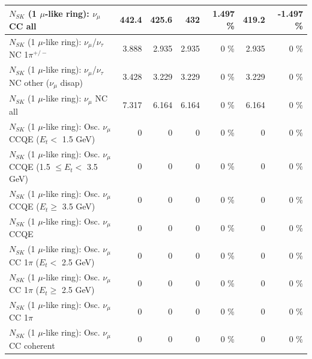 \begin{table}
\begin{tabular}{| l | r | r | r  r | r  r |}
                                $N_{SK}$ (1 $\mu$-like ring): $\nu_{\mu}$ CC all &           442.4 &           425.6 &             432 &    1.497 \%  &           419.2 &   -1.497 \%  \\ 
\hline
              $N_{SK}$ (1 $\mu$-like ring): $\nu_\mu$/$\nu_\tau$ NC 1$\pi^{+/-}$ &           3.888 &           2.935 &           2.935 &        0 \%  &           2.935 &        0 \%  \\ 
   $N_{SK}$ (1 $\mu$-like ring): $\nu_\mu$/$\nu_\tau$ NC other ($\nu_\mu$ disap) &           3.428 &           3.229 &           3.229 &        0 \%  &           3.229 &        0 \%  \\ 
                                $N_{SK}$ (1 $\mu$-like ring): $\nu_{\mu}$ NC all &           7.317 &           6.164 &           6.164 &        0 \%  &           6.164 &        0 \%  \\ 
\hline
\hline
           $N_{SK}$ (1 $\mu$-like ring): Osc. $\nu_\mu$ CCQE ($E_{t} <$ 1.5 GeV) &               0 &               0 &               0 &        0 \%  &               0 &        0 \%  \\ 
  $N_{SK}$ (1 $\mu$-like ring): Osc. $\nu_\mu$ CCQE (1.5 $\leq E_{t} <$ 3.5 GeV) &               0 &               0 &               0 &        0 \%  &               0 &        0 \%  \\ 
        $N_{SK}$ (1 $\mu$-like ring): Osc. $\nu_\mu$ CCQE ($E_{t} \geq$ 3.5 GeV) &               0 &               0 &               0 &        0 \%  &               0 &        0 \%  \\ 
\hline
                               $N_{SK}$ (1 $\mu$-like ring): Osc. $\nu_\mu$ CCQE &               0 &               0 &               0 &        0 \%  &               0 &        0 \%  \\ 
\hline
      $N_{SK}$ (1 $\mu$-like ring): Osc. $\nu_\mu$ CC 1$\pi$ ($E_{t} <$ 2.5 GeV) &               0 &               0 &               0 &        0 \%  &               0 &        0 \%  \\ 
   $N_{SK}$ (1 $\mu$-like ring): Osc. $\nu_\mu$ CC 1$\pi$ ($E_{t} \geq$ 2.5 GeV) &               0 &               0 &               0 &        0 \%  &               0 &        0 \%  \\ 
\hline
                          $N_{SK}$ (1 $\mu$-like ring): Osc. $\nu_\mu$ CC 1$\pi$ &               0 &               0 &               0 &        0 \%  &               0 &        0 \%  \\ 
                        $N_{SK}$ (1 $\mu$-like ring): Osc. $\nu_\mu$ CC coherent &               0 &               0 &               0 &        0 \%  &               0 &        0 \%  \\ 

\end{tabular}
\end{table}
